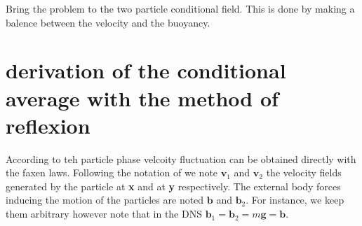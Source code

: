 Bring the problem to the two particle conditional field. 
This is done by making a balence between the velocity and the buoyancy. 


\section{derivation of the conditional average with the method of reflexion}


According to \citet{kim2013microhydrodynamics,zhang2021ensemble} teh particle phase velcoity fluctuation can be obtained directly with the faxen laws.
Following the notation of \citet{kim2013microhydrodynamics} we note $\textbf{v}_1$ and $\textbf{v}_2$ the velocity fields generated by the particle at \textbf{x} and at \textbf{y} respectively. 
The external body forces inducing the motion of the particles are noted $\textbf{b}$ and $\textbf{b}_2$. 
For instance, we keep them arbitrary however note that in the DNS $\textbf{b}_1 = \textbf{b}_2 = m\textbf{g} = \textbf{b}$. 

